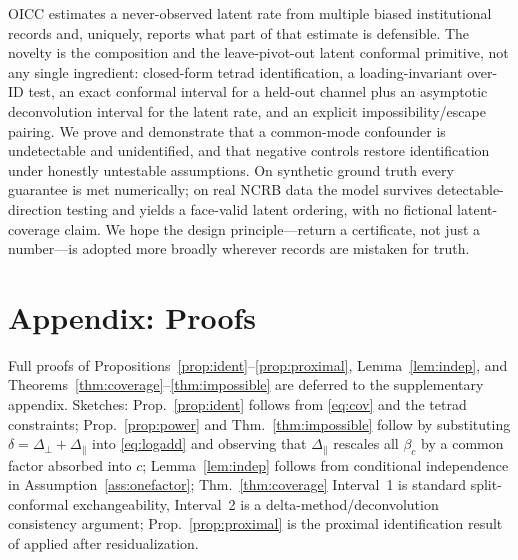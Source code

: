 \documentclass[11pt]{article}
\theoremstyle{definition}
\theoremstyle{remark}
\newcommand{\dperp}{\Delta_{\perp}}
\newcommand{\dpar}{\Delta_{\parallel}}
\begin{document}
OICC estimates a never-observed latent rate from multiple biased
institutional records and, uniquely, reports what part of that estimate is
defensible. The novelty is the composition and the leave-pivot-out latent
conformal primitive, not any single ingredient: closed-form tetrad
identification, a loading-invariant over-ID test, an exact conformal interval
for a held-out channel plus an asymptotic deconvolution interval for the
latent rate, and an explicit impossibility/escape pairing. We prove and
demonstrate that a common-mode confounder is undetectable and unidentified,
and that negative controls restore identification under honestly untestable
assumptions. On synthetic ground truth every guarantee is met numerically;
on real NCRB data the model survives detectable-direction testing and yields
a face-valid latent ordering, with no fictional latent-coverage claim. We
hope the design principle---return a certificate, not just a number---is
adopted more broadly wherever records are mistaken for truth.

\appendix
\section*{Appendix: Proofs}
Full proofs of Propositions~\ref{prop:ident}--\ref{prop:proximal},
Lemma~\ref{lem:indep}, and Theorems~\ref{thm:coverage}--\ref{thm:impossible}
are deferred to the supplementary appendix. Sketches: Prop.~\ref{prop:ident}
follows from \eqref{eq:cov} and the tetrad constraints; Prop.~\ref{prop:power}
and Thm.~\ref{thm:impossible} follow by substituting $\delta=\dperp+\dpar$
into \eqref{eq:logadd} and observing that $\dpar$ rescales all
$\beta_c$ by a common factor absorbed into $c$; Lemma~\ref{lem:indep}
follows from conditional independence in Assumption~\ref{ass:onefactor};
Thm.~\ref{thm:coverage} Interval~1 is standard split-conformal exchangeability,
Interval~2 is a delta-method/deconvolution consistency argument;
Prop.~\ref{prop:proximal} is the proximal identification result of
\cite{miao2018,kurokipearl2014} applied after residualization.
\end{document}
